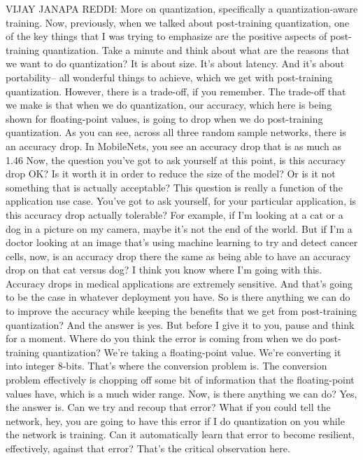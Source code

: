 VIJAY JANAPA REDDI: More on quantization, specifically
a quantization-aware training.
Now, previously, when we talked about post-training quantization,
one of the key things that I was trying to emphasize
are the positive aspects of post-training quantization.
Take a minute and think about what are the reasons
that we want to do quantization?
It is about size.
It's about latency.
And it's about portability--
all wonderful things to achieve, which we get with post-training quantization.
However, there is a trade-off, if you remember.
The trade-off that we make is that when we do quantization,
our accuracy, which here is being shown for floating-point values,
is going to drop when we do post-training quantization.
As you can see, across all three random sample networks,
there is an accuracy drop.
In MobileNets, you see an accuracy drop that is as much as 1.46%
Now, the question you've got to ask yourself at this point,
is this accuracy drop OK?
Is it worth it in order to reduce the size of the model?
Or is it not something that is actually acceptable?
This question is really a function of the application use case.
You've got to ask yourself, for your particular application,
is this accuracy drop actually tolerable?
For example, if I'm looking at a cat or a dog in a picture on my camera,
maybe it's not the end of the world.
But if I'm a doctor looking at an image that's
using machine learning to try and detect cancer cells,
now, is an accuracy drop there the same as being
able to have an accuracy drop on that cat versus dog?
I think you know where I'm going with this.
Accuracy drops in medical applications are extremely sensitive.
And that's going to be the case in whatever deployment you have.
So is there anything we can do to improve
the accuracy while keeping the benefits that we
get from post-training quantization?
And the answer is yes.
But before I give it to you, pause and think for a moment.
Where do you think the error is coming from when
we do post-training quantization?
We're taking a floating-point value.
We're converting it into integer 8-bits.
That's where the conversion problem is.
The conversion problem effectively is chopping off
some bit of information that the floating-point values have,
which is a much wider range.
Now, is there anything we can do?
Yes, the answer is.
Can we try and recoup that error?
What if you could tell the network, hey, you
are going to have this error if I do quantization
on you while the network is training.
Can it automatically learn that error to become resilient, effectively,
against that error?
That's the critical observation here.
